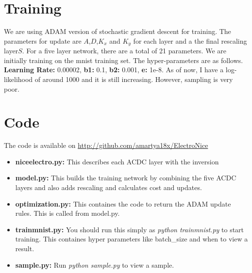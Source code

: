 \documentclass{article}
\begin{document}
\section{Training}
We are using ADAM version of stochastic gradient descent for training. The parameters for update are $A$,$D$,$K_x$ and $K_y$ for each layer and a the final rescaling layer$S$. For a five layer network, there are a total of 21 parameters. We are initially training on the mnist training set. The hyper-parameters are as follows.
\textbf{Learning Rate: }0.00002, \textbf{b1: }0.1, \textbf{b2: }0.001, \textbf{e: }1e-8.
As of now, I have a log-likelihood of around 1000 and it is still increasing. However, sampling is very poor.
\section{Code}
The code is available on \url{http://github.com/amartya18x/ElectroNice}
\begin{itemize}
\item  \textbf{niceelectro.py:} This describes each ACDC layer with the inversion
\item \textbf{model.py:} This builds the training network by combining the five ACDC layers and also adds rescaling and calculates cost and updates.
\item \textbf{optimization.py:} This containes the code to return the ADAM update rules. This is called from model.py.
\item \textbf{trainmnist.py:} You should run this simply as \textit{python trainmnist.py} to start training. This containes hyper parameters like batch\_size and when to view a result.
\item \textbf{sample.py:} Run \textit{python sample.py} to view a sample.
\end{itemize}
\end{document}
